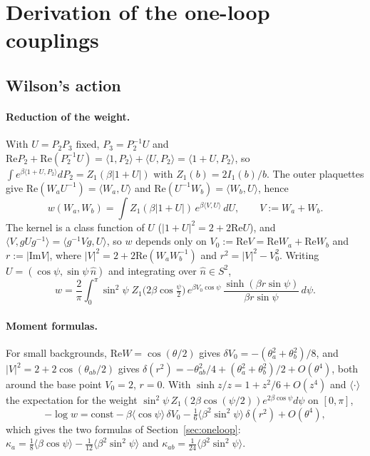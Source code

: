 \documentclass[11pt,a4paper]{article}
\theoremstyle{definition}
\theoremstyle{remark}
\begin{document}
\appendix
\section{Derivation of the one-loop couplings}\label{app:oneloop}

\subsection{Wilson's action}\label{app:wilson}
\paragraph{Reduction of the weight.}
With $U=P_2P_3$ fixed, $P_3=P_2^{-1}U$ and $\mathrm{Re}P_2+\mathrm{Re}(P_2^{-1}U)=\langle1,P_2\rangle+\langle U,P_2\rangle=\langle1+U,P_2\rangle$, so $\int e^{\beta\langle1+U,P_2\rangle}dP_2=Z_1(\beta|1+U|)$ with $Z_1(b)=2I_1(b)/b$.
The outer plaquettes give $\mathrm{Re}(W_aU^{-1})=\langle W_a,U\rangle$ and $\mathrm{Re}(U^{-1}W_b)=\langle W_b,U\rangle$, hence
\[
w(W_a,W_b)=\int Z_1(\beta|1+U|)\,e^{\beta\langle V,U\rangle}\,dU,\qquad V:=W_a+W_b .
\]
The kernel is a class function of $U$ ($|1+U|^2=2+2\mathrm{Re}U$), and $\langle V,gUg^{-1}\rangle=\langle g^{-1}Vg,U\rangle$, so $w$ depends only on $V_0:=\mathrm{Re}V=\mathrm{Re}W_a+\mathrm{Re}W_b$ and $r:=|\mathrm{Im}V|$, where $|V|^2=2+2\mathrm{Re}(W_aW_b^{-1})$ and $r^2=|V|^2-V_0^2$.
Writing $U=(\cos\psi,\sin\psi\,\hat n)$ and integrating over $\hat n\in S^2$,
\[
w=\frac2\pi\int_0^\pi\sin^2\psi\;Z_1\bigl(2\beta\cos\tfrac\psi2\bigr)\,e^{\beta V_0\cos\psi}\,\frac{\sinh(\beta r\sin\psi)}{\beta r\sin\psi}\,d\psi .
\]

\paragraph{Moment formulas.}
For small backgrounds, $\mathrm{Re}W=\cos(\theta/2)$ gives $\delta V_0=-(\theta_a^2+\theta_b^2)/8$, and $|V|^2=2+2\cos(\theta_{ab}/2)$ gives $\delta(r^2)=-\theta_{ab}^2/4+(\theta_a^2+\theta_b^2)/2+O(\theta^4)$, both around the base point $V_0=2$, $r=0$.
With $\sinh z/z=1+z^2/6+O(z^4)$ and $\langle\cdot\rangle$ the expectation for the weight $\sin^2\psi\,Z_1(2\beta\cos(\psi/2))e^{2\beta\cos\psi}d\psi$ on $[0,\pi]$,
\[
-\log w=\mathrm{const}-\beta\langle\cos\psi\rangle\,\delta V_0-\tfrac16\langle\beta^2\sin^2\psi\rangle\,\delta(r^2)+O(\theta^4),
\]
which gives the two formulas of Section~\ref{sec:oneloop}:
$\kappa_a=\tfrac18\langle\beta\cos\psi\rangle-\tfrac1{12}\langle\beta^2\sin^2\psi\rangle$ and $\kappa_{ab}=\tfrac1{24}\langle\beta^2\sin^2\psi\rangle$.
\end{document}
